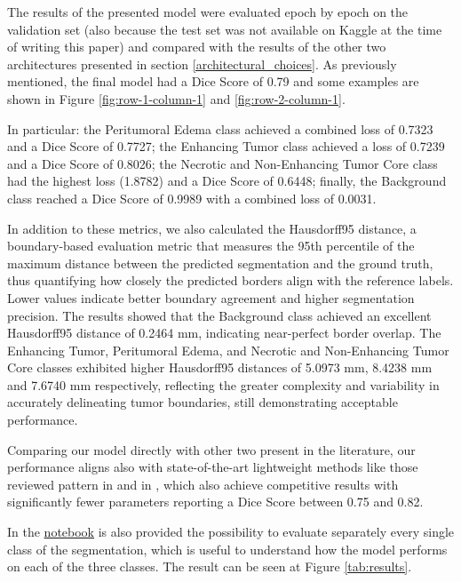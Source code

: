 \documentclass[10pt,twocolumn,letterpaper]{article}
\begin{document}
The results of the presented model were evaluated epoch by epoch on the validation set (also because the test set was not available on Kaggle at the time of writing this paper) and compared with the results of the other two architectures presented in section \ref{architectural_choices}.
As previously mentioned, the final model had a Dice Score of 0.79 and some examples are shown in Figure \ref{fig:row-1-column-1} and \ref{fig:row-2-column-1}.

In particular: the Peritumoral Edema class achieved a combined loss of 0.7323 and a Dice Score of 0.7727; the Enhancing Tumor class achieved a loss of 0.7239 and a Dice Score of 0.8026; the Necrotic and Non-Enhancing Tumor Core class had the highest loss (1.8782) and a Dice Score of 0.6448; finally, the Background class reached a Dice Score of 0.9989 with a combined loss of 0.0031.

In addition to these metrics, we also calculated the Hausdorff95 distance, a boundary-based evaluation metric that measures the 95th percentile of the maximum distance between the predicted segmentation and the ground truth, thus quantifying how closely the predicted borders align with the reference labels. Lower values indicate better boundary agreement and higher segmentation precision. The results showed that the Background class achieved an excellent Hausdorff95 distance of 0.2464 mm, indicating near-perfect border overlap. The Enhancing Tumor, Peritumoral Edema, and Necrotic and Non-Enhancing Tumor Core classes exhibited higher Hausdorff95 distances of 5.0973 mm, 8.4238 mm and 7.6740 mm respectively, reflecting the greater complexity and variability in accurately delineating tumor boundaries, still demonstrating acceptable performance.

Comparing our model directly with other two present in the literature, our performance aligns also with state-of-the-art lightweight methods like those reviewed pattern in \cite{An2024DWKD} and in \cite{Gutierrez2024Brain}, which also achieve competitive results with significantly fewer parameters reporting a Dice Score between 0.75 and 0.82.

In the \href{https://github.com/dugoalberto/3D_CNN}{notebook} is also provided the possibility to evaluate separately every single class of the segmentation, which is useful to understand how the model performs on each of the three classes. The result can be seen at Figure \ref{tab:results}.
\end{document}
